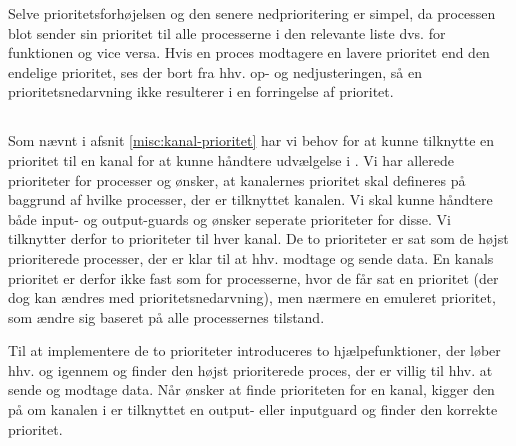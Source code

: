 Selve prioritetsforhøjelsen og den senere nedprioritering er simpel, da processen blot sender sin prioritet til alle processerne i den relevante liste dvs.  for   funktionen og vice versa. Hvis en proces modtagere en lavere prioritet end den endelige prioritet, ses der bort fra hhv. op- og nedjusteringen, så en prioritetsnedarvning ikke resulterer i en forringelse af prioritet. 

\subsection{}

Som nævnt i afsnit \cref{misc:kanal-prioritet} har vi behov for at kunne tilknytte en prioritet til en kanal for at kunne håndtere udvælgelse i . Vi har allerede prioriteter for processer og ønsker, at kanalernes prioritet skal defineres på baggrund af hvilke processer, der er tilknyttet kanalen. Vi skal kunne håndtere både input- og output-guards og ønsker seperate prioriteter for disse. Vi tilknytter derfor to prioriteter til hver kanal. De to prioriteter er sat som  de højst prioriterede processer, der er klar til at hhv. modtage og sende data. En kanals prioritet er derfor ikke fast som for processerne, hvor de får sat en prioritet (der dog kan ændres med prioritetsnedarvning), men nærmere en emuleret prioritet, som ændre sig baseret på alle processernes tilstand. 

Til at implementere de to prioriteter introduceres  to hjælpefunktioner, der løber hhv.  og  igennem og  finder den højst prioriterede proces, der er villig til hhv. at sende og modtage data. Når   ønsker at finde prioriteten for en kanal, kigger den på om kanalen i  er tilknyttet en output- eller inputguard og finder den korrekte prioritet.

